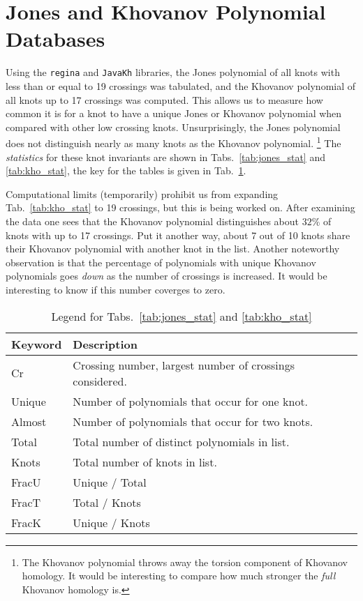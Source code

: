 \documentclass{article}
\theoremstyle{plain}
\begin{document}
    \section{Jones and Khovanov Polynomial Databases}
        Using the \texttt{regina} and \texttt{JavaKh} libraries, the Jones
        polynomial of all knots with less than or equal to 19 crossings was
        tabulated, and the Khovanov polynomial of all knots up to 17 crossings
        was computed. This allows us to measure how common it is for a knot
        to have a unique Jones or Khovanov polynomial when compared with other
        low crossing knots. Unsurprisingly, the Jones polynomial does not
        distinguish nearly as many knots as the Khovanov polynomial.%
        \footnote{%
            The Khovanov polynomial throws away the torsion component of
            Khovanov homology. It would be interesting to compare how much
            stronger the \textit{full} Khovanov homology is.
        }
        The \textit{statistics} for these knot invariants are shown in
        Tabs.~\ref{tab:jones_stat} and \ref{tab:kho_stat}, the key for the
        tables is given in Tab.~\ref{tab:key}.
        \par\hfill\par
        Computational limits (temporarily) prohibit us from expanding
        Tab.~\ref{tab:kho_stat} to 19 crossings, but this is being worked on.
        After examining the data one sees that the Khovanov polynomial
        distinguishes about $32\%$ of knots with up to 17 crossings. Put it
        another way, about 7 out of 10 knots share their Khovanov polynomial
        with another knot in the list. Another noteworthy observation is that
        the percentage of polynomials with unique Khovanov polynomials goes
        \textit{down} as the number of crossings is increased. It would be
        interesting to know if this number coverges to zero.
        \begin{table}
            \centering
            \begin{tabular}{| l | l |}
                \hline
                Keyword & Description\\
                \hline
                Cr     & Crossing number, largest number of crossings considered.\\
                Unique & Number of polynomials that occur for one knot.\\
                Almost & Number of polynomials that occur for two knots.\\
                Total  & Total number of distinct polynomials in list.\\
                Knots  & Total number of knots in list.\\
                FracU  & Unique / Total\\
                FracT  & Total / Knots\\
                FracK  & Unique / Knots\\
                \hline
            \end{tabular}
            \caption{Legend for Tabs.~\ref{tab:jones_stat} and \ref{tab:kho_stat}}
            \label{tab:key}
        \end{table}
\end{document}
